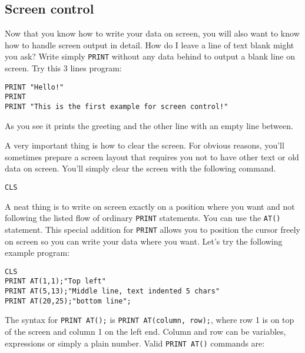 \subsection{Screen control}

Now that you know how to write your data on screen, you will also want to know
how to handle screen output in detail. How do I leave a line of text blank
might you ask? Write simply \verb|PRINT| without any data behind to output a
blank line on screen. Try this 3 lines program:

\begin{mdframed}[hidealllines=true,backgroundcolor=blue!20]
\begin{verbatim}
PRINT "Hello!"
PRINT
PRINT "This is the first example for screen control!"
\end{verbatim}
\end{mdframed}

As you see it prints the greeting and the other line with an empty line
between. 

A very important thing is how to clear the screen. For obvious reasons, you'll
sometimes prepare a screen layout that requires you not to have other text or
old data on screen. You'll simply clear the screen with the following command.

\begin{mdframed}[hidealllines=true,backgroundcolor=blue!20]
\begin{verbatim}
CLS
\end{verbatim}
\end{mdframed}

A neat thing is to write on screen exactly on a position where you want and not
following the listed flow of ordinary \verb|PRINT| statements. You can use the
\verb|AT()| statement. This special addition for \verb|PRINT| allows you to
position the cursor freely on screen so you can write your data where you want.
Let's try the following example program:

\begin{mdframed}[hidealllines=true,backgroundcolor=blue!20]
\begin{verbatim}
CLS
PRINT AT(1,1);"Top left"
PRINT AT(5,13);"Middle line, text indented 5 chars"
PRINT AT(20,25);"bottom line";
\end{verbatim}
\end{mdframed}

The syntax for \verb|PRINT AT();| is \verb|PRINT AT(column, row);|, where row 1 is
on top of the screen and column 1 on the left end. Column and row can be
variables, expressions or simply a plain number. Valid \verb|PRINT AT()|
commands are:

